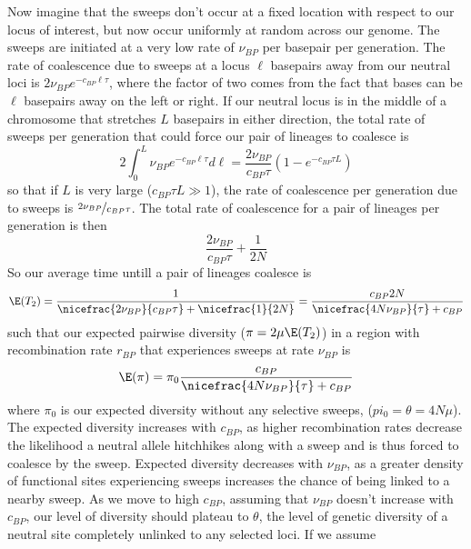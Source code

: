 Now imagine that the sweeps don't occur at a fixed location with
respect to our locus of interest, but now occur uniformly at random
across our genome. The sweeps are initiated at a very low rate of
$\nu_{BP}$ per basepair per generation. The rate of coalescence due to
sweeps at a locus $\ell$ basepairs away from our neutral loci is
$2\nu_{BP} e^{-c_{BP} \ell \tau}$, where the factor of two comes from
the fact that bases can be $\ell$ basepairs away on the left or right. If our neutral locus is in the
middle of a chromosome that stretches $L$ basepairs in either direction,
the total rate of sweeps per generation that could force our pair of lineages to coalesce is
\begin{equation}
2\int_0^{L} \nu_{BP} e^{-c_{BP} \ell \tau} d \ell =
\frac{2\nu_{BP}}{c_{BP} \tau} \left(1-e^{-c_{BP} \tau L} \right)
\end{equation}
so that if $L$ is very large ($c_{BP} \tau L \gg 1$), the rate of coalescence per
generation due to sweeps is $\nicefrac{2\nu_{BP}}{c_{BP} \tau}$. The total rate
of coalescence for a pair of lineages per generation is then
\begin{equation}
\frac{2\nu_{BP}}{c_{BP} \tau}+\frac{1}{2N}
\end{equation}
So our average time untill a pair of lineages coalesce is
\begin{equation}
\E(T_2) = \frac{1}{\nicefrac{2\nu_{BP}}{c_{BP} \tau}+\nicefrac{1}{2N}} = \frac{c_{BP}2N}{\nicefrac{4N\nu_{BP}}{ \tau}+c_{BP}}
\end{equation}
such that our expected pairwise diversity ($\pi=2\mu\E(T_2)$) in a region with
recombination rate $r_{BP}$ that experiences sweeps at rate $\nu_{BP}$
is  
\begin{equation}
\E(\pi) = \pi_0 \frac{c_{BP}}{\nicefrac{4N\nu_{BP}}{ \tau}+c_{BP}} \label{eqn:pi_GW_HH}
\end{equation}
where $\pi_0$ is our expected diversity without any selective sweeps, ($pi_0=\theta=4N\mu$).  The expected diversity increases with $c_{BP}$, as higher
recombination rates decrease the likelihood a neutral allele hitchhikes along with a sweep and is thus forced to
coalesce by the sweep. Expected diversity decreases with $\nu_{BP}$, as
a greater density of functional sites experiencing sweeps increases the chance of
being linked to a nearby sweep. As we move to high $c_{BP}$, assuming
that $\nu_{BP}$ doesn't increase with $c_{BP}$, our level of diversity
should plateau to $\theta$, the level of genetic diversity of a
neutral site completely unlinked to any selected loci. If we assume
